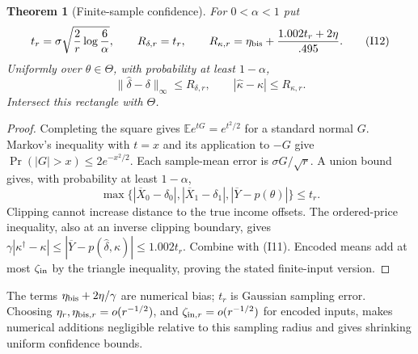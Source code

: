 \documentclass[11pt,a4paper]{article}
\newtheorem{theorem}{Theorem}
\newcommand{\E}{\mathbb E}
\begin{document}
\begin{theorem}[Finite-sample confidence]\label{thm:gaussian-inference}
For $0<\alpha<1$ put
\[
 t_r=\sigma\sqrt{\frac2r\log\frac6\alpha},\qquad
 R_{\delta,r}=t_r,\qquad
 R_{\kappa,r}=\eta_{\rm bis}+\frac{1.002t_r+2\eta}{.495}.              \tag{I12}
\]
Uniformly over $\theta\in\Theta$, with probability at least $1-\alpha$,
\[
 \|\widehat\delta-\delta\|_\infty\leq R_{\delta,r},\qquad
 |\widehat\kappa-\kappa|\leq R_{\kappa,r}.                   \tag{I13}
\]
Intersect this rectangle with $\Theta$.
\end{theorem}
\begin{proof}
Completing the square gives $\E e^{tG}=e^{t^2/2}$ for a standard normal $G$.
Markov's inequality with $t=x$ and its application to $-G$ give
$\Pr(|G|>x)\leq2e^{-x^2/2}$. Each sample-mean error is
$\sigma G/\sqrt r$. A union bound gives, with probability at least $1-\alpha$,
\[
 \max\{|\overline X_0-\delta_0|,|\overline X_1-\delta_1|,
                         |\overline Y-p(\theta)|\}\leq t_r. \tag{I16}
\]
Clipping cannot increase distance to the true income offsets. The ordered-price
inequality, also at an inverse clipping boundary, gives
$\gamma|\kappa^\dagger-\kappa|\leq
|\overline Y-p(\widehat\delta,\kappa)|\leq1.002t_r$.
Combine with \textup{(I11)}. Encoded means add at most $\zeta_{\rm in}$
by the triangle inequality, proving the stated finite-input version.
\end{proof}
The terms $\eta_{\rm bis}+2\eta/\gamma$ are numerical bias; $t_r$ is Gaussian sampling
error. Choosing $\eta_r,\eta_{{\rm bis},r}=o(r^{-1/2})$, and
$\zeta_{{\rm in},r}=o(r^{-1/2})$ for encoded inputs, makes numerical additions negligible
relative to this sampling radius and gives shrinking uniform confidence bounds.
\end{document}

